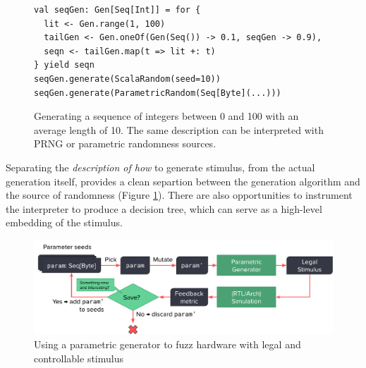 \documentclass[sigplan,review,nonacm,9pt]{acmart}
\begin{document}
\begin{figure}
\begin{verbatim}
val seqGen: Gen[Seq[Int]] = for {
  lit <- Gen.range(1, 100)
  tailGen <- Gen.oneOf(Gen(Seq()) -> 0.1, seqGen -> 0.9),
  seqn <- tailGen.map(t => lit +: t)
} yield seqn
seqGen.generate(ScalaRandom(seed=10))
seqGen.generate(ParametricRandom(Seq[Byte](...)))
\end{verbatim}
\caption{Generating a sequence of integers between 0 and 100 with an average length of 10. The same description can be interpreted with PRNG or parametric randomness sources.}
\label{fig:randomapi}
\end{figure}

Separating the \textit{description of how} to generate stimulus, from the actual generation itself, provides a clean separtion between the generation algorithm and the source of randomness (Figure \ref{fig:randomapi}).
There are also opportunities to instrument the interpreter to produce a decision tree, which can serve as a high-level embedding of the stimulus.

\begin{figure}
\includegraphics[width=\linewidth]{fuzzing/parametric_fuzzing_hw.pdf}
\caption{Using a parametric generator to fuzz hardware with legal and controllable stimulus}
\label{fig:parametric_fuzzing}
\end{figure}

%
%
\end{document}
